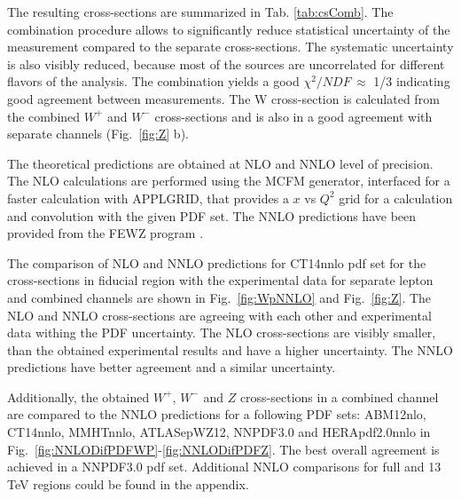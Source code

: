 

The resulting cross-sections are summarized in Tab. \ref{tab:csComb}.  The combination procedure allows to significantly reduce statistical uncertainty of the measurement compared to the separate cross-sections. The systematic uncertainty is also visibly reduced, because most of the sources are uncorrelated for different flavors of the analysis. The combination yields a good $\chi^2/NDF\, \approx$ 1/3 indicating good agreement between measurements.  The W cross-section is calculated from the combined $W^+$ and $W^-$ cross-sections and is also in a good agreement with separate channels (Fig.~\ref{fig:Z} b).

The theoretical predictions are obtained at NLO and NNLO level of precision.  The NLO calculations are performed using the MCFM generator\cite{MCFM}, interfaced for a faster calculation with APPLGRID\cite{APPLGRID}, that provides a $x$ vs $Q^2$ grid for a calculation and convolution with the given PDF set. The NNLO predictions have been provided from the FEWZ  program \cite{FEWZ}.

The comparison of NLO and NNLO predictions for CT14nnlo\cite{CT14} pdf set for the cross-sections in fiducial region with the experimental data for separate lepton and combined channels are shown in Fig.~\ref{fig:WpNNLO} and Fig.~\ref{fig:Z}. The NLO and NNLO cross-sections are agreeing with each other and experimental data withing the PDF uncertainty. The NLO cross-sections are visibly smaller, than the obtained experimental results and have a higher uncertainty. The NNLO predictions have better agreement and a similar uncertainty.

Additionally, the obtained $W^+$, $W^-$ and $Z$ cross-sections in a combined channel are compared to the NNLO predictions for a following PDF sets: ABM12nlo\cite{ABM12}, CT14nnlo\cite{CT14}, MMHTnnlo\cite{MMHT}, ATLASepWZ12\cite{ATLASEP}, NNPDF3.0\cite{NNPDF23} and HERApdf2.0nnlo\cite{HERAPDF} in Fig.~\ref{fig:NNLODifPDFWP}-\ref{fig:NNLODifPDFZ}. The best overall agreement is achieved in a NNPDF3.0 pdf set.  Additional NNLO comparisons for full and 13 TeV regions could be found in the appendix.

